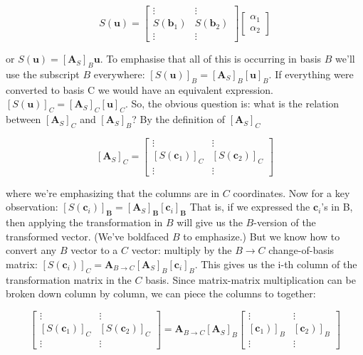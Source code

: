 \documentclass[main.tex]{subfiles}
\begin{document}
    $$
    S(\mathbf{u})=\left[\begin{array}{cc}
    \vdots & \vdots \\
    S\left(\mathbf{b}_{1}\right) & S\left(\mathbf{b}_{2}\right) \\
    \vdots & \vdots
    \end{array}\right]\left[\begin{array}{l}
    \alpha_{1} \\
    \alpha_{2}
    \end{array}\right]
    $$
    
    or $S(\mathbf{u})=\left[\mathbf{A}_{S}\right]_{B} \mathbf{u}$. To emphasise that all of this is occurring in basis $B$ we'll use the subscript $B$ everywhere: $[S(\mathbf{u})]_{B}=\left[\mathbf{A}_{S}\right]_{B}[\mathbf{u}]_{B}$.
    If everything were converted to basis C we would have an equivalent expression. $[S(\mathbf{u})]_{C}=\left[\mathbf{A}_{S}\right]_{C}[\mathbf{u}]_{C}$. So, the obvious question is: what is the relation between $\left[\mathbf{A}_{S}\right]_{C}$ and $\left[\mathbf{A}_{S}\right]_{B}$? By the definition of $\left[\mathbf{A}_{S}\right]_{C}$ 
    
    $$
    \left[\mathbf{A}_{S}\right]_{C}=\left[\begin{array}{cc}
    \vdots & \vdots \\
    {\left[S\left(\mathbf{c}_{1}\right)\right]_{C}} & {\left[S\left(\mathbf{c}_{2}\right)\right]_{C}} \\
    \vdots & \vdots
    \end{array}\right]
    $$
    
    where we're emphasizing that the columns are in $C$ coordinates. Now for a key observation: $\left[S\left(\mathbf{c}_{i}\right)\right]_{\mathbf{B}}=\left[\mathbf{A}_{S}\right]_{\mathbf{B}}\left[\mathbf{c}_{i}\right]_{\mathbf{B}}$ That is, if we expressed the $\mathbf{c}_{i}$'s in B, then applying the transformation in $B$ will give us the $B$-version of the transformed vector. (We've boldfaced $B$ to emphasize.) But we know how to convert any $B$ vector to a $C$ vector: multiply by the $B \rightarrow C$ change-of-basis matrix: $\left[S\left(\mathbf{c}_{i}\right)\right]_{C}=\mathbf{A}_{B \rightarrow C}\left[\mathbf{A}_{S}\right]_{B}\left[\mathbf{c}_{i}\right]_{B}$. This gives us the i-th column of the transformation matrix in the $C$ basis. Since matrix-matrix multiplication can be broken down column by column, we can piece the columns to together:
    
    $$
    \left[\begin{array}{cc}
    \vdots & \vdots \\
    {\left[S\left(\mathbf{c}_{1}\right)\right]_{C}} & {\left[S\left(\mathbf{c}_{2}\right)\right]_{C}} \\
    \vdots & \vdots
    \end{array}\right]=\mathbf{A}_{B \rightarrow C}\left[\mathbf{A}_{S}\right]_{B}\left[\begin{array}{cc}
    \vdots & \vdots \\
    \left.\left[\mathbf{c}_{1}\right)\right]_{B} & \left.\left[\mathbf{c}_{2}\right)\right]_{B} \\
    \vdots & \vdots
    \end{array}\right]
    $$
    
\end{document}

